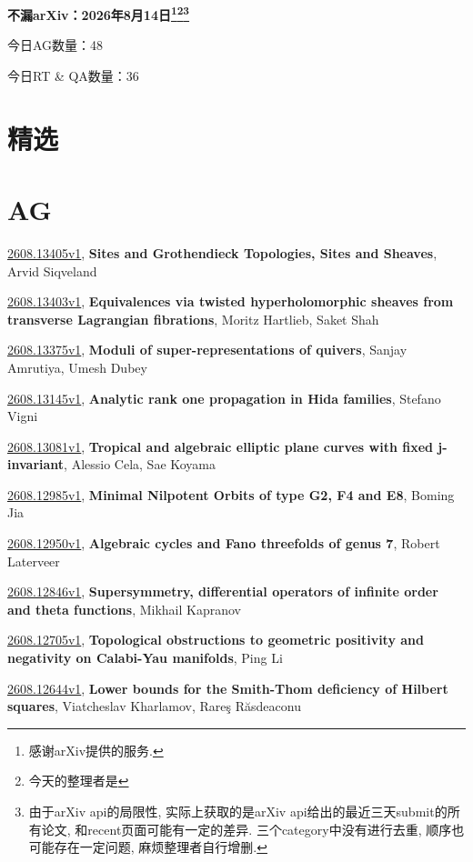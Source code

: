 \documentclass[9pt, a4paper]{article}
\theoremstyle{plain}
\theoremstyle{definition}
\theoremstyle{remark}
\newcommand{\arxiv}[3]{\href{https://arxiv.org/abs/#1}{#1}, \textbf{\textcolor{arxivblue}{#2}}, #3}
\newcommand{\AGnumber}{48}
\newcommand{\RTQAnumber}{36}
\newcommand{\NewestDate}{2026年8月14日}
\newcommand{\todayarXiver}{} %
\begin{document}
\begin{center}
    \Huge\textbf{不漏arXiv：\NewestDate\footnote{感谢arXiv提供的服务.}\footnote{今天的整理者是\todayarXiver}\footnote{由于arXiv api的局限性, 实际上获取的是arXiv api给出的最近三天submit的所有论文, 和recent页面可能有一定的差异. 三个category中没有进行去重, 顺序也可能存在一定问题, 麻烦整理者自行增删.}} \\
\end{center}

\setcounter{section}{-1}

\begin{center}
    今日AG数量：\AGnumber
    
    今日RT \& QA数量：\RTQAnumber
    
\end{center}


\section{精选}


\section{AG}
\arxiv{2608.13405v1}{Sites and Grothendieck Topologies, Sites and Sheaves}{Arvid Siqveland}

\arxiv{2608.13403v1}{Equivalences via twisted hyperholomorphic sheaves from transverse Lagrangian fibrations}{Moritz Hartlieb, Saket Shah}

\arxiv{2608.13375v1}{Moduli of super-representations of quivers}{Sanjay Amrutiya, Umesh Dubey}

\arxiv{2608.13145v1}{Analytic rank one propagation in Hida families}{Stefano Vigni}

\arxiv{2608.13081v1}{Tropical and algebraic elliptic plane curves with fixed j-invariant}{Alessio Cela, Sae Koyama}

\arxiv{2608.12985v1}{Minimal Nilpotent Orbits of type G2, F4 and E8}{Boming Jia}

\arxiv{2608.12950v1}{Algebraic cycles and Fano threefolds of genus 7}{Robert Laterveer}

\arxiv{2608.12846v1}{Supersymmetry, differential operators of infinite order and theta functions}{Mikhail Kapranov}

\arxiv{2608.12705v1}{Topological obstructions to geometric positivity and negativity on Calabi-Yau manifolds}{Ping Li}

\arxiv{2608.12644v1}{Lower bounds for the Smith-Thom deficiency of Hilbert squares}{Viatcheslav Kharlamov, Rareş Răsdeaconu}
\end{document}
